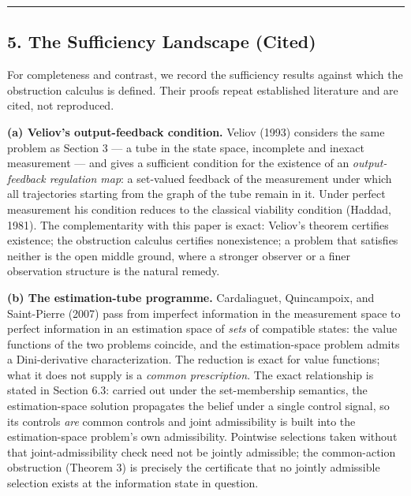 \documentclass[11pt]{article}
\begin{document}
\begin{center}\rule{0.5\linewidth}{0.5pt}\end{center}

\subsection{5. The Sufficiency Landscape
(Cited)}\label{the-sufficiency-landscape-cited}

For completeness and contrast, we record the sufficiency results against
which the obstruction calculus is defined. Their proofs repeat
established literature and are cited, not reproduced.

\textbf{(a) Veliov's output-feedback condition.} Veliov (1993) considers
the same problem as Section 3 --- a tube in the state space, incomplete
and inexact measurement --- and gives a sufficient condition for the
existence of an \emph{output-feedback regulation map}: a set-valued
feedback of the measurement under which all trajectories starting from
the graph of the tube remain in it. Under perfect measurement his
condition reduces to the classical viability condition (Haddad, 1981).
The complementarity with this paper is exact: Veliov's theorem certifies
existence; the obstruction calculus certifies nonexistence; a problem
that satisfies neither is the open middle ground, where a stronger observer or a finer observation structure is the natural remedy.

\textbf{(b) The estimation-tube programme.} Cardaliaguet, Quincampoix,
and Saint-Pierre (2007) pass from imperfect information in the
measurement space to perfect information in an estimation space of
\emph{sets} of compatible states: the value functions of the two
problems coincide, and the estimation-space problem admits a
Dini-derivative characterization. The reduction is exact for value
functions; what it does not supply is a \emph{common prescription}. The exact relationship is stated in Section 6.3: carried out under the set-membership semantics, the estimation-space solution propagates the belief under a single control signal, so its controls \emph{are} common controls and joint admissibility is built into the estimation-space problem's own admissibility. Pointwise selections taken without that joint-admissibility check need not be jointly admissible; the common-action obstruction (Theorem 3) is precisely the certificate that no jointly admissible selection exists at the information state in question.
\end{document}
